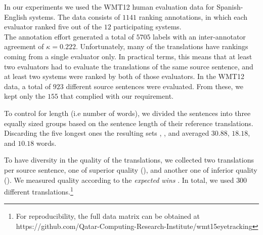 In our experiments we used the WMT12 \cite{WMT12} human evaluation data for Spanish-English systems. The data consists of $1141$ ranking annotations, in which each evaluator ranked %
five out of the $12$ participating systems. \\
The annotation effort generated a total of $5705$ labels with an inter-annotator agreement of $\kappa=0.222$. Unfortunately, many of the translations have rankings coming from a single evaluator only.%
In practical terms, this means that at least two evaluators had to evaluate the translations of the same source sentence, and 
at least two systems were ranked by both of those evaluators.
In the WMT12 data, a total of $923$ different source sentences were evaluated. %
From these, we kept only the $155$ that complied with our requirement. 

\vspace{5pt}
To control for length (i.e number of words), we divided the sentences into three equally sized groups based on the sentence length of their reference translations.  Discarding the five longest ones the resulting sets \llong, \lmid, and \lshort averaged $30.88$, $18.18$, and $10.18$ words.
\vspace{5pt}

To have diversity in the quality of the translations, 
we collected two translations per source sentence, one of superior quality (\qmax), and another one of inferior quality (\qmin). We measured quality 
according to the \emph{expected wins} \cite{WMT12}. In total, we used $300$ different translations.\footnote{For reproducibility, the full data matrix can be obtained at {https://github.com/Qatar-Computing-Research-Institute/wmt15eyetracking}}
\vspace{5pt}


